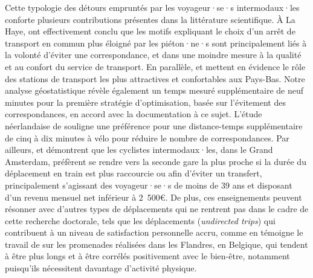 \begin{refsegment}
Cette typologie des détours empruntés par les voyageur·se·s intermodaux·les conforte plusieurs contributions présentes dans la littérature scientifique. À La Haye, \textcolor{blue}{\textcite[3]{rijsman_walking_2019}} ont effectivement conclu que les motifs expliquant le choix d'un arrêt de transport en commun plus éloigné par les piéton·ne·s sont principalement liés à la volonté d'éviter une correspondance, et dans une moindre mesure à la qualité et au confort du service de transport. En parallèle, \textcolor{blue}{\textcite[468]{jonkeren_bicycle-train_2021}} et \textcolor{blue}{\textcite[2144]{krizek_bicycling_2010}} mettent en évidence le rôle des stations de transport les plus attractives et confortables aux Pays-Bas. Notre analyse géostatistique révèle également un temps mesuré supplémentaire de neuf minutes pour la première stratégie d'optimisation, basée sur l'évitement des correspondances, en accord avec la documentation à ce sujet. L'étude néerlandaise de \textcolor{blue}{\textcite[665]{mil_insights_2020}} souligne une préférence pour une distance-temps supplémentaire de cinq à dix minutes à vélo pour réduire le nombre de correspondances. Par ailleurs, \textcolor{blue}{\textcite[143]{kampen_bicycle_2021}} et \textcolor{blue}{\textcite{kampen_understanding_2021}} démontrent que les cyclistes intermodaux·les, dans le Grand Amsterdam, préfèrent se rendre vers la seconde gare la plus proche si la durée du déplacement en train est plus raccourcie ou afin d'éviter un transfert, principalement s'agissant des voyageur·se·s de moins de 39 ans et disposant d'un revenu mensuel net inférieur à 2~500€. De plus, ces enseignements peuvent résonner avec d'autres types de déplacements qui ne rentrent pas dans le cadre de cette recherche doctorale, tels que les déplacements  (\textsl{undirected trips}) qui contribuent à un niveau de satisfaction personnelle accru, comme en témoigne le travail de \textcolor{blue}{\textcite[8-9]{hook_undirected_2021}} sur les promenades réalisées dans les Flandres, en Belgique, qui tendent à être plus longs et à être corrélés positivement avec le bien-être, notamment puisqu'ils nécessitent davantage d'activité physique.%


\end{refsegment}
